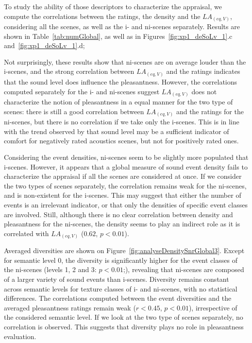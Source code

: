 \documentclass[twoside,twocolumn]{article}
\begin{document}
To study the ability of those descriptors to characterize the appraisal, we compute the correlations between the ratings, the density and the $LA_{(eq,V)}$, considering all the scenes, as well as the i- and ni-scenes separately. Results are shown in Table~\ref{tab:numGlobal}, as well as in Figures~\ref{fig:xp1_deSoLv_1}.c and~\ref{fig:xp1_deSoLv_1}.d;

Not surprisingly, these results show that ni-scenes are on average louder than the i-scenes, and the strong correlation between $LA_{(eq,V)}$ and the ratings indicates that the sound level does influence the pleasantness. However, the correlations computed separately for the i- and ni-scenes suggest $LA_{(eq,V)}$ does not characterize the notion of pleasantness in a equal manner for the two type of scenes:  there is still a good correlation between $LA_{(eq,V)}$ and the ratings for the ni-scenes, but there is no correlation if we take only the i-scenes. This is in line with the trend observed by \cite{lavandier2006contribution} that sound level may be a sufficient indicator of comfort for negatively rated acoustics scenes, but not for positively rated ones.

Considering the event densities, ni-scenes seem to be slightly more populated that i-scenes. However, it appears that a global measure of sound event density fails to characterize the appraisal if all the scenes are considered at once. If we consider the two types of scenes separately, the correlation remains weak for the ni-scenes, and is non-existent for the i-scenes. This may suggest that either the number of events is an irrelevant indicator, or that only the densities of specific event classes are involved. Still, although there is no clear correlation between density and pleasantness for the ni-scenes, the density seems to play an indirect role as it is correlated with $LA_{(eq,V)}$ ($0.62$, $p<0.01$).

Averaged diversities are shown on Figure~\ref{fig:analyseDensitySnrGlobal3}. Except for semantic level 0, the diversity is significantly higher for the event classes of the ni-scenes (levels 1, 2 and 3: $p<0.01$;), revealing that ni-scenes are composed of a larger variety of sound events than i-scenes. Diversity remains constant across semantic levels for texture classes of i- and ni-scenes, with no statistical differences. The correlations computed between the event diversities and the averaged pleasantness ratings remain weak ($r<0.45$, $p<0.01$), irrespective of the considered semantic level. If we look at the two type of scenes separately, no correlation is observed. This suggests that diversity plays no role in pleasantness evaluation.
\end{document}
